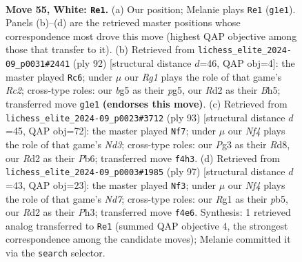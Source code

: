 \documentclass[11pt]{article}
\begin{document}
\clearpage

\begin{figure}[p]\centering
\begin{subfigure}{0.46\textwidth}\centering
\resizebox{\linewidth}{!}{%
\newchessgame
\chessboard[
  setfen={2k5/1p5p/n5pP/p4pb1/5N2/r5P1/3R3K/6R1 w - - 6 55},
  showmover=false,
  pgfstyle=straightmove, color=movearrow, markmove={g1-e1}
]}
\caption{}
\end{subfigure}\hfill
\begin{subfigure}{0.46\textwidth}\centering
\resizebox{\linewidth}{!}{%
\newchessgame
\chessboard[
  setfen={8/5pk1/3bp2p/6pB/8/6PP/2R1KP2/7r w - - 8 47},
  showmover=false,
  pgfstyle=straightmove, color=movearrow, markmove={c2-c6}
]}
\caption{}
\end{subfigure}
\\[4pt]
\begin{subfigure}{0.46\textwidth}\centering
\resizebox{\linewidth}{!}{%
\newchessgame
\chessboard[
  setfen={3r4/6k1/1p1n1pP1/2pR1P1K/P7/1P5B/8/8 b - - 0 47},
  showmover=false,
  pgfstyle=straightmove, color=movearrow, markmove={d6-f7}
]}
\caption{}
\end{subfigure}\hfill
\begin{subfigure}{0.46\textwidth}\centering
\resizebox{\linewidth}{!}{%
\newchessgame
\chessboard[
  setfen={8/8/7k/1P2p1p1/8/4B1Pp/1r1n1P1P/R6K b - - 6 49},
  showmover=false,
  pgfstyle=straightmove, color=movearrow, markmove={d2-f3}
]}
\caption{}
\end{subfigure}
\caption{\textbf{Move 55, White: \texttt{Re1}.} (a) Our position; Melanie plays \texttt{Re1} (\texttt{g1e1}). Panels (b)--(d) are the retrieved master positions whose correspondence most drove this move (highest QAP objective among those that transfer to it). (b) Retrieved from \texttt{lichess\_elite\_2024-09\_p0031\#2441} (ply 92) [structural distance $d$=46, QAP obj=4]: the master played \texttt{Rc6}; under $\mu$ our \emph{Rg1} plays the role of that game's \emph{Rc2}; cross-type roles: our \emph{b}g5 as their \emph{p}g5, our \emph{R}d2 as their \emph{B}h5; transferred move \texttt{g1e1} \textbf{(endorses this move)}. (c) Retrieved from \texttt{lichess\_elite\_2024-09\_p0023\#3712} (ply 93) [structural distance $d$=45, QAP obj=72]: the master played \texttt{Nf7}; under $\mu$ our \emph{Nf4} plays the role of that game's \emph{Nd3}; cross-type roles: our \emph{P}g3 as their \emph{R}d8, our \emph{R}d2 as their \emph{P}b6; transferred move \texttt{f4h3}. (d) Retrieved from \texttt{lichess\_elite\_2024-09\_p0003\#1985} (ply 97) [structural distance $d$=43, QAP obj=23]: the master played \texttt{Nf3}; under $\mu$ our \emph{Nf4} plays the role of that game's \emph{Nd7}; cross-type roles: our \emph{R}g1 as their \emph{p}b5, our \emph{R}d2 as their \emph{P}h3; transferred move \texttt{f4e6}. Synthesis: 1 retrieved analog transferred to \texttt{Re1} (summed QAP objective 4, the strongest correspondence among the candidate moves); Melanie committed it via the \texttt{search} selector.}
\label{fig:thought-m108}
\end{figure}
\end{document}
